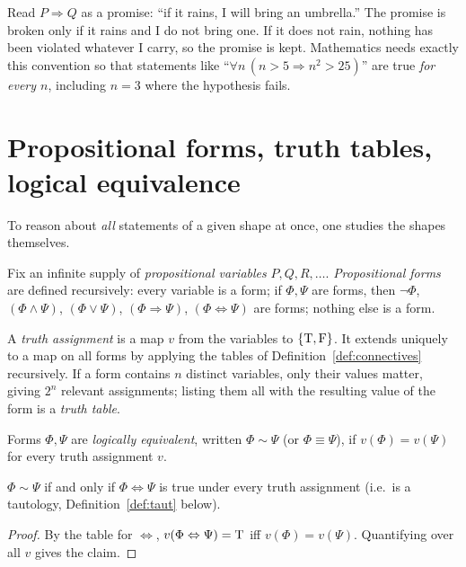 \begin{intuition}
	Read $P\Rightarrow Q$ as a promise: ``if it rains, I will bring an umbrella.'' The promise is broken only if it rains and I do not bring one. If it does not rain, nothing has been violated whatever I carry, so the promise is kept. Mathematics needs exactly this convention so that statements like ``$\forall n\,(n>5\Rightarrow n^2>25)$'' are true \emph{for every $n$}, including $n=3$ where the hypothesis fails.
\end{intuition}

\section{Propositional forms, truth tables, logical equivalence}

To reason about \emph{all} statements of a given shape at once, one studies the shapes themselves.

\begin{definition}
	Fix an infinite supply of \emph{propositional variables} $P,Q,R,\dots$. \emph{Propositional forms} are defined recursively: every variable is a form; if $\Phi,\Psi$ are forms, then $\neg\Phi$, $(\Phi\wedge\Psi)$, $(\Phi\vee\Psi)$, $(\Phi\Rightarrow\Psi)$, $(\Phi\Leftrightarrow\Psi)$ are forms; nothing else is a form.
\end{definition}

\begin{definition}
	A \emph{truth assignment} is a map $v$ from the variables to $\{\mathrm{T},\mathrm{F}\}$. It extends uniquely to a map on all forms by applying the tables of Definition~\ref{def:connectives} recursively. If a form contains $n$ distinct variables, only their values matter, giving $2^n$ relevant assignments; listing them all with the resulting value of the form is a \emph{truth table}.
\end{definition}

\begin{definition}
	Forms $\Phi,\Psi$ are \emph{logically equivalent}, written $\Phi\sim\Psi$ (or $\Phi\equiv\Psi$), if $v(\Phi)=v(\Psi)$ for every truth assignment $v$.
\end{definition}

\begin{proposition}\label{prop:equiv-taut}
	$\Phi\sim\Psi$ if and only if $\Phi\Leftrightarrow\Psi$ is true under every truth assignment (i.e.\ is a tautology, Definition~\ref{def:taut} below).
\end{proposition}
\begin{proof}
	By the table for $\Leftrightarrow$, $v(\Phi\Leftrightarrow\Psi)=\mathrm{T}$ iff $v(\Phi)=v(\Psi)$. Quantifying over all $v$ gives the claim.
\end{proof}

